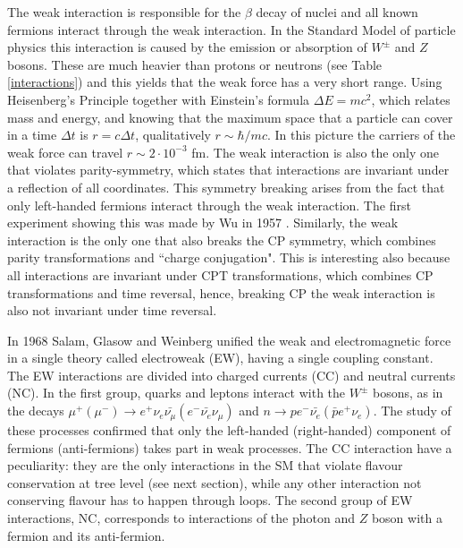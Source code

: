 The weak interaction is responsible for the $\beta$ decay of nuclei and all known fermions interact through the weak
interaction. In the Standard Model of particle physics this interaction is caused by the emission or absorption of $W^\pm$
and $Z$ bosons. These are much heavier than protons or neutrons (see Table \ref{interactions}) and this yields that the weak
force has a very short range. Using Heisenberg's Principle together with Einstein's formula $\Delta E = m c^2$, which relates
mass and energy, and knowing that the maximum space that a particle can cover in a time $\Delta t$ is $r = c \Delta t$,
qualitatively $r \sim \hbar / mc$. In this picture the carriers of the weak force can travel $r \sim 2 \cdot 10^{-3}$ fm.
The weak interaction is also the only one that violates parity-symmetry, which states that interactions are invariant under
a reflection of all coordinates. This symmetry breaking arises from the fact that only left-handed fermions interact through
the weak interaction. The first experiment showing this was made by Wu in 1957 \cite{Wu:1957my}. Similarly, the weak interaction
is the only one that also breaks the CP symmetry, which combines parity transformations and ``charge conjugation".
This is interesting also because all interactions are invariant under CPT transformations, which combines CP transformations
and time reversal, hence, breaking CP the weak interaction is also not invariant under time reversal.

In 1968 Salam, Glasow and Weinberg unified the weak and electromagnetic force in a single theory called electroweak (EW),
having a single coupling constant\cite{PDG2012}. The EW interactions are divided into charged currents (CC) and neutral
currents (NC). In the first group, quarks and leptons interact with the $W^\pm$ bosons, as in the decays
$\mu^+(\mu^-) \rightarrow e^+ \nu_e \bar{\nu_\mu} (e^- \bar{\nu_e} \nu_\mu)$ and $n \rightarrow p e^- \bar{\nu_e} (\bar{p} e^+ \nu_e)$.
The study of these processes confirmed that only the left-handed (right-handed) component of fermions (anti-fermions)
takes part in weak processes. The CC interaction have a peculiarity: they are the only interactions in the SM that violate
flavour conservation at tree level (see next section), while any other interaction not conserving flavour has to happen through
loops. The second group of EW interactions, NC, corresponds to interactions of the photon and $Z$ boson with a fermion
and its anti-fermion.

